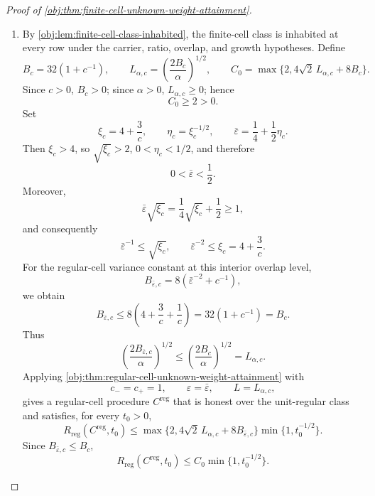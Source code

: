 \documentclass[11pt]{article}
\begin{document}
\begin{proof}[Proof of \cref{obj:thm:finite-cell-unknown-weight-attainment}]
\begin{enumerate}
\item
By \cref{obj:lem:finite-cell-class-inhabited}, the finite-cell class is inhabited at every row under the carrier, ratio, overlap, and growth hypotheses.  Define
\[
B_c=32(1+c^{-1}),\qquad
L_{\alpha,c}=\left(\frac{2B_c}{\alpha}\right)^{1/2},\qquad
C_0=\max\{2,4\sqrt2\,L_{\alpha,c}+8B_c\}.
\]
Since \(c>0\), \(B_c>0\); since \(\alpha>0\), \(L_{\alpha,c}\ge0\); hence
\[
C_0\ge2>0.
\]
Set
\[
\xi_c=4+\frac3c,\qquad
\eta_c=\xi_c^{-1/2},\qquad
\bar\varepsilon=\frac14+\frac12\eta_c .
\]
Then \(\xi_c>4\), so \(\sqrt{\xi_c}>2\), \(0<\eta_c<1/2\), and therefore
\[
0<\bar\varepsilon<\frac12 .
\]
Moreover,
\[
\bar\varepsilon\sqrt{\xi_c}
=
\frac14\sqrt{\xi_c}+\frac12
\ge 1,
\]
and consequently
\[
\bar\varepsilon^{-1}\le \sqrt{\xi_c},
\qquad
\bar\varepsilon^{-2}\le \xi_c=4+\frac3c .
\]
For the regular-cell variance constant at this interior overlap level,
\[
B_{\bar\varepsilon,c}
=
8(\bar\varepsilon^{-2}+c^{-1}),
\]
we obtain
\[
B_{\bar\varepsilon,c}
\le
8\left(4+\frac3c+\frac1c\right)
=
32(1+c^{-1})
=
B_c .
\]
Thus
\[
\left(\frac{2B_{\bar\varepsilon,c}}{\alpha}\right)^{1/2}
\le
\left(\frac{2B_c}{\alpha}\right)^{1/2}
=
L_{\alpha,c}.
\]
Applying \cref{obj:thm:regular-cell-unknown-weight-attainment} with
\[
c_-=c_+=1,\qquad \varepsilon=\bar\varepsilon,\qquad L=L_{\alpha,c},
\]
gives a regular-cell procedure \(C^{\mathrm{reg}}\) that is honest over the unit-regular class and satisfies, for every \(t_0>0\),
\[
R_{\mathrm{reg}}(C^{\mathrm{reg}},t_0)
\le
\max\{2,4\sqrt2\,L_{\alpha,c}+8B_{\bar\varepsilon,c}\}
\min\{1,t_0^{-1/2}\}.
\]
Since \(B_{\bar\varepsilon,c}\le B_c\),
\[
R_{\mathrm{reg}}(C^{\mathrm{reg}},t_0)
\le
C_0\min\{1,t_0^{-1/2}\}.
\]


\end{enumerate}
\end{proof}
\end{document}
